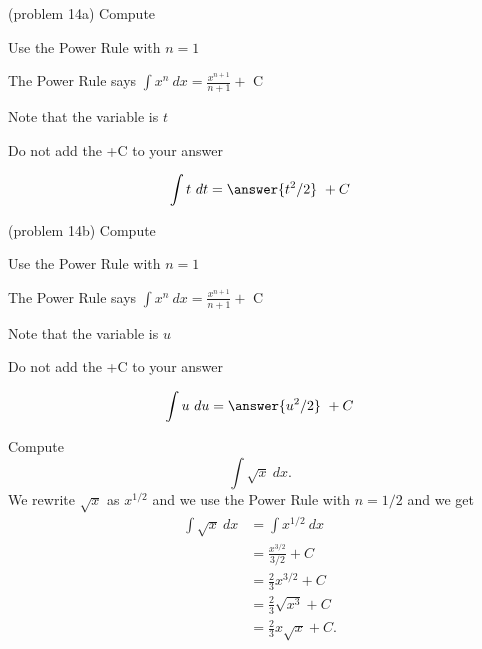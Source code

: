 \documentclass[handout]{ximera}
\begin{document}
\begin{problem}(problem 14a)
Compute 

\begin{hint}
Use the Power Rule with $n=1$
\end{hint}
\begin{hint}
The Power Rule says $\int x^n \ dx = \frac{x^{n+1}}{n+1} +$ C
\end{hint}
\begin{hint}
Note that the variable is $t$
\end{hint}
\begin{hint}
\begin{center}
Do not add the +C to your answer
\end{center}
\end{hint}

\[
\int t \ dt =
\answer{t^2 /2} \ + C
\]
\end{problem}



\begin{problem}(problem 14b)
Compute 

\begin{hint}
Use the Power Rule with $n=1$
\end{hint}
\begin{hint}
The Power Rule says $\int x^n \ dx = \frac{x^{n+1}}{n+1} +$ C
\end{hint}
\begin{hint}
Note that the variable is $u$
\end{hint}
\begin{hint}
\begin{center}
Do not add the +C to your answer
\end{center}
\end{hint}

\[
\int u \ du =
\answer{u^2 /2} \ + C
\]
\end{problem}


\begin{example}[example 15]
Compute $$\int \sqrt x \ dx.$$
We rewrite $\sqrt x$ as $x^{1/2}$ and we use the Power Rule with $n= 1/2$ and we get
\begin{align*}
\int \sqrt x \ dx &= \int x^{1/2} \ dx\\
&= \frac{x^{3/2}}{3/2} + C\\
&= \tfrac{2}{3}x^{3/2} + C\\ 
&= \tfrac23 \sqrt {x^3} + C\\
&= \tfrac23 x\sqrt {x} + C.
\end{align*}
\end{example}
\end{document}
